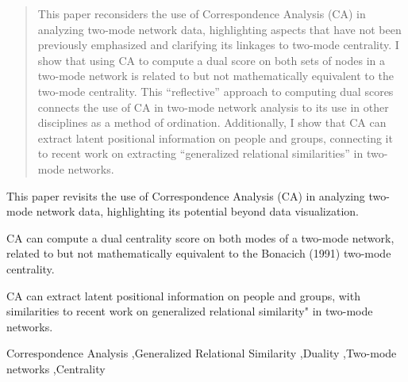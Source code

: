 \documentclass[a4paper,fleqn]{cas-sc}
\begin{document}
\begin{abstract}
This paper reconsiders the use of Correspondence Analysis (CA) in analyzing two-mode network data, highlighting aspects that have not been previously emphasized and clarifying its linkages to two-mode centrality. I show that using CA to compute a dual score on both sets of nodes in a two-mode network is related to but not mathematically equivalent to the \citet{bonacich1991simultaneous} two-mode centrality. This ``reflective'' approach to computing dual scores connects the use of CA in two-mode network analysis to its use in other disciplines as a method of ordination. Additionally, I show that CA can extract latent positional information on people and groups, connecting it to recent work on extracting ``generalized relational similarities'' in two-mode networks. 
\end{abstract}


\begin{highlights}
  \item This paper revisits the use of Correspondence Analysis (CA) in analyzing two-mode network data, highlighting its potential beyond data visualization.
  \item CA can compute a dual centrality score on both modes of a two-mode network, related to but not mathematically equivalent to the Bonacich (1991) two-mode centrality. 
  \item CA can extract latent positional information on people and groups, with similarities to recent work on generalized relational similarity" in two-mode networks. 
\end{highlights}

\begin{keywords}
Correspondence Analysis \sep Generalized Relational Similarity \sep Duality \sep Two-mode networks \sep Centrality 
\end{keywords}

\maketitle
\newpage
\end{document}
